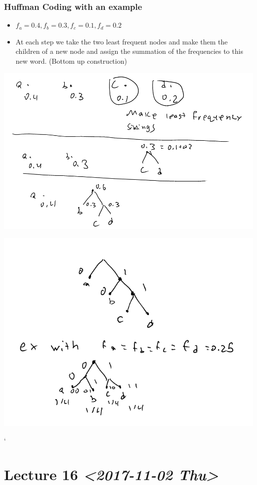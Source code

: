 \documentclass[11pt]{article}
\begin{document}
\subsubsection{Huffman Coding with an example}
\label{sec:org41a2128}
\begin{itemize}
\item \(f_a =0.4, f_b = 0.3, f_c = 0.1, f_d = 0.2\)
\item At each step we take the two least frequent nodes and make them the children of a new node and assign the summation of the frequencies to this new word. (Bottom up construction)
\end{itemize}
\begin{center}
\includegraphics[width=.9\linewidth]{./Images/i64.png}
\end{center}
\begin{center}
\includegraphics[width=.9\linewidth]{./Images/i65.png}
\end{center}`
\section{Lecture 16 \textit{<2017-11-02 Thu>}}
\label{sec:org654dea2}
\end{document}
